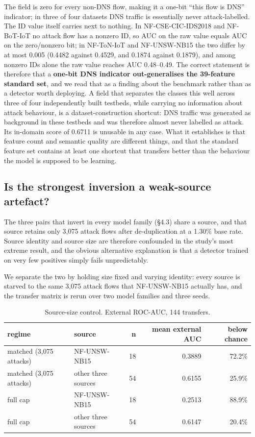 \documentclass[11pt,a4paper]{article}
\begin{document}
The field is zero for every non-DNS flow, making it a one-bit ``this flow is DNS'' indicator; in three of four datasets DNS traffic is essentially never attack-labelled. The ID value itself carries next to nothing. In NF-CSE-CIC-IDS2018 and NF-BoT-IoT no attack flow has a nonzero ID, so AUC on the raw value equals AUC on the zero/nonzero bit; in NF-ToN-IoT and NF-UNSW-NB15 the two differ by at most 0.005 (0.4482 against 0.4529, and 0.1874 against 0.1879), and among nonzero IDs alone the raw value reaches AUC 0.48--0.49. The correct statement is therefore that a \textbf{one-bit DNS indicator out-generalises the 39-feature standard set}, and we read that as a finding about the benchmark rather than as a detector worth deploying. A field that separates the classes this well across three of four independently built testbeds, while carrying no information about attack behaviour, is a dataset-construction shortcut: DNS traffic was generated as background in these testbeds and was therefore almost never labelled as attack. Its in-domain score of 0.6711 is unusable in any case. What it establishes is that feature count and semantic quality are different things, and that the standard feature set contains at least one shortcut that transfers better than the behaviour the model is supposed to be learning.

\subsection{Is the strongest inversion a weak-source artefact?}

The three pairs that invert in every model family (§4.3) share a source, and that source retains only 3,075 attack flows after de-duplication at a 1.30\% base rate. Source identity and source size are therefore confounded in the study's most extreme result, and the obvious alternative explanation is that a detector trained on very few positives simply fails unpredictably.

We separate the two by holding size fixed and varying identity: every source is starved to the same 3,075 attack flows that NF-UNSW-NB15 actually has, and the transfer matrix is rerun over two model families and three seeds.

\begin{table}[htbp]\centering\small
\caption{Source-size control. External ROC-AUC, 144 transfers.}
\begin{tabular}{llrrr}
\toprule
regime & source & n & mean external AUC & below chance \\
\midrule
matched (3,075 attacks) & NF-UNSW-NB15 & 18 & 0.3889 & 72.2\% \\
matched (3,075 attacks) & other three sources & 54 & 0.6155 & 25.9\% \\
full cap & NF-UNSW-NB15 & 18 & 0.2513 & 88.9\% \\
full cap & other three sources & 54 & 0.6147 & 20.4\% \\
\bottomrule
\end{tabular}
\end{table}
\end{document}
